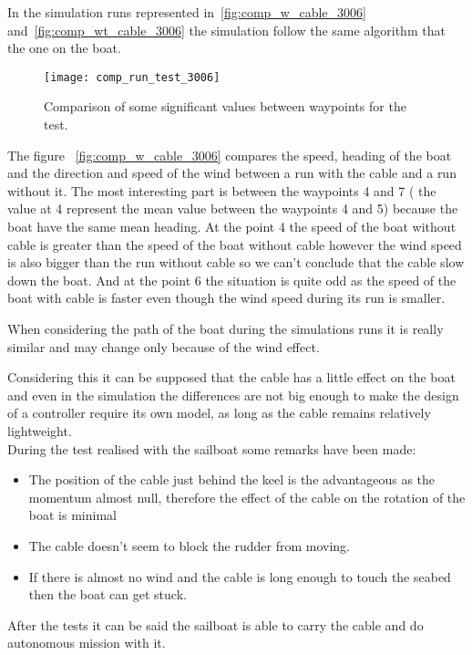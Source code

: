 In the simulation runs represented in~\ref{fig:comp_w_cable_3006} and~\ref{fig:comp_wt_cable_3006} the simulation follow the same algorithm that the one on the boat.

 \begin{figure}[H]
    \centering
    \texttt{[image: comp\_run\_test\_3006]}
    \caption{Comparison of some significant values between waypoints for the test.}
    \label{fig:comp_run_306}
\end{figure}

The figure ~\ref{fig:comp_w_cable_3006} compares the speed, heading of the boat and the direction and speed of the wind between a run with the cable and a run without it. The most interesting part is between the waypoints 4 and 7 ( the value at 4 represent the mean value between the waypoints 4 and 5)  because the boat have the same mean heading. At the point 4 the speed of the boat without cable is greater than the speed of the boat without cable however the wind speed is also bigger than the run without cable so we can't conclude that the cable slow down the boat. And at the point 6 the situation is quite odd as the speed of the boat with cable is faster 
even though the wind speed during its run is smaller.

When considering the path of the boat during the simulations runs it is really similar and may change only because of the wind effect.

Considering this it can be supposed that the cable has a little effect on the boat and even in the simulation the differences are not big enough to make the design of a controller require its own model, as long as the cable remains relatively lightweight.\\
 
During the test realised with the sailboat some remarks have been made:

 
 \begin{itemize}[label=$-$,itemsep=0cm,topsep=0cm]
\item  The position of the cable just behind the keel is the advantageous as the momentum almost null, therefore the effect of the cable on the rotation of the boat is minimal
\item The cable doesn't seem to block the rudder from moving.
\item If there is almost no wind and the cable is long enough to touch the seabed then the boat can get stuck.
\end{itemize}

After the tests it can be said the sailboat is able to carry the cable and do autonomous mission with it.

